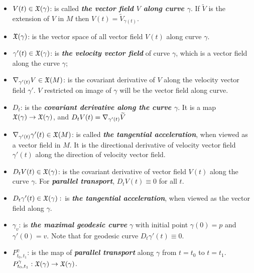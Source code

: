 \documentclass[11pt]{article}
\begin{document}
\begin{itemize}
\item  $V(t) \in {\mathfrak X}(\gamma)$: \quad is called \emph{\textbf{the vector field $V$ along curve $\gamma$}}. If $\widetilde{V}$ is the extension of $V$ in $M$ then $V(t) = \widetilde{V}_{\gamma(t)}$.

\item ${\mathfrak X}(\gamma)$: \quad is the vector space of all vector field $V(t)$ along curve $\gamma$.

\item $\gamma'(t) \in  {\mathfrak X}(\gamma)$: \quad is \emph{\textbf{the velocity vector field}} of curve $\gamma$, which is a vector field along the curve $\gamma$;

\item $\nabla_{\gamma'(t)}{V} \in {\mathfrak X}(M)$: \quad is the covariant derivative of $V$ along the velocity vector field $\gamma'$. $V$ restricted on image of $\gamma$ will be the vector field along curve. 

\item $D_t$: \quad is the \emph{\textbf{covariant derivative along the curve $\gamma$}}. It is a map ${\mathfrak X}(\gamma) \rightarrow {\mathfrak X}(\gamma)$, and $D_tV(t) = \nabla_{\gamma'(t)}{ \widetilde{V}}$

\item $\nabla_{\gamma'(t)}{\gamma'(t)} \in {\mathfrak X}(M)$: \quad is called \emph{\textbf{the tangential acceleration}},  when viewed as a vector field in $M$. It is the directional derivative of velocity vector field $\gamma'(t)$ along the direction of velocity vector field.

\item $D_tV(t) \in {\mathfrak X}(\gamma)$: \quad is the covariant derivative of vector field $V(t)$ along the curve $\gamma$. For \emph{\textbf{parallel transport}}, $D_tV(t) \equiv 0$ for all $t$.

\item $D_t\gamma'(t) \in {\mathfrak X}(\gamma):$ \quad is \emph{\textbf{the tangential acceleration}}, when viewed as the vector field along $\gamma$.

\item $\gamma_{v}$: \quad is \emph{\textbf{the maximal geodesic curve}} $\gamma$ with initial point $\gamma(0) =p$ and $\gamma'(0) = v$. Note that for geodesic curve $D_t\gamma'(t) \equiv 0$.

\item $P_{t_0, t_1}^{\gamma}$: \quad is the map of \emph{\textbf{parallel transport}} along $\gamma$ from $t=t_0$ to $t =t_1$. $P_{t_0, t_1}^{\gamma}: {\mathfrak X}(\gamma) \rightarrow {\mathfrak X}(\gamma)$.


\end{itemize}
\end{document}

